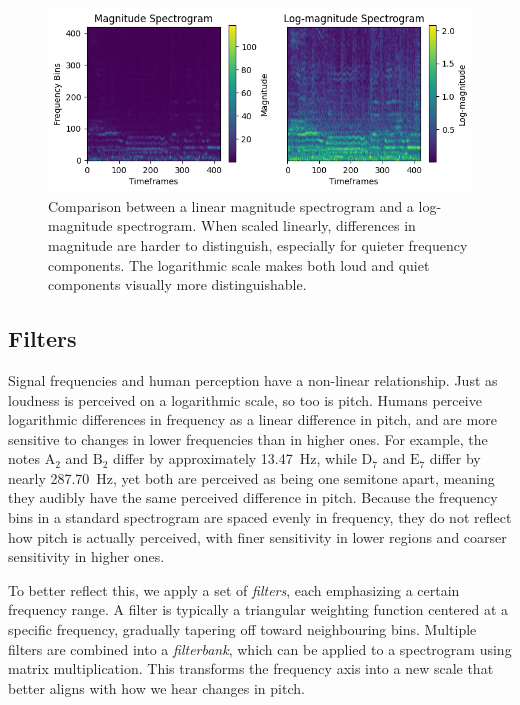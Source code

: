 \begin{figure}[H]
    \centering
    \hspace*{-1.0cm}
    \includegraphics[scale=1.0]{figures/spectrogramlogspectrogram}
    \caption{Comparison between a linear magnitude spectrogram and a log-magnitude spectrogram. When scaled linearly, differences in magnitude are harder to distinguish, especially for quieter frequency components. The logarithmic scale makes both loud and quiet components visually more distinguishable.}
    \label{SpectrogramLogspectrogramFigure}
\end{figure}

\subsection{Filters}

Signal frequencies and human perception have a non-linear relationship. Just as loudness is perceived on a logarithmic scale, so too is pitch. Humans perceive logarithmic differences in frequency as a linear difference in pitch, and are more sensitive to changes in lower frequencies than in higher ones. For example, the notes $\text{A}_2$ and $\text{B}_2$ differ by approximately 13.47~Hz, while $\text{D}_7$ and $\text{E}_7$ differ by nearly 287.70~Hz, yet both are perceived as being one semitone apart, meaning they audibly have the same perceived difference in pitch. Because the frequency bins in a standard spectrogram are spaced evenly in frequency, they do not reflect how pitch is actually perceived, with finer sensitivity in lower regions and coarser sensitivity in higher ones.

To better reflect this, we apply a set of \textit{filters}, each emphasizing a certain frequency range. A filter is typically a triangular weighting function centered at a specific frequency, gradually tapering off toward neighbouring bins. Multiple filters are combined into a \textit{filterbank}, which can be applied to a spectrogram using matrix multiplication. This transforms the frequency axis into a new scale that better aligns with how we hear changes in pitch.

